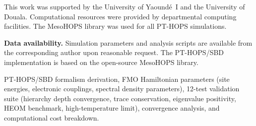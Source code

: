 \documentclass[journal=jpcl,manuscript=letter]{achemso}
\begin{document}
\begin{acknowledgement}
This work was supported by the University of Yaoundé~I and the University of Douala. Computational resources were provided by departmental computing facilities. The MesoHOPS library was used for all PT-HOPS simulations.
\end{acknowledgement}


\textbf{Data availability.} Simulation parameters and analysis scripts are available from the corresponding author upon reasonable request. The PT-HOPS/SBD implementation is based on the open-source MesoHOPS library.


\begin{suppinfo}
PT-HOPS/SBD formalism derivation, FMO Hamiltonian parameters (site energies, electronic couplings, spectral density parameters), 12-test validation suite (hierarchy depth convergence, trace conservation, eigenvalue positivity, HEOM benchmark, high-temperature limit), convergence analysis, and computational cost breakdown.
\end{suppinfo}



\end{document}
